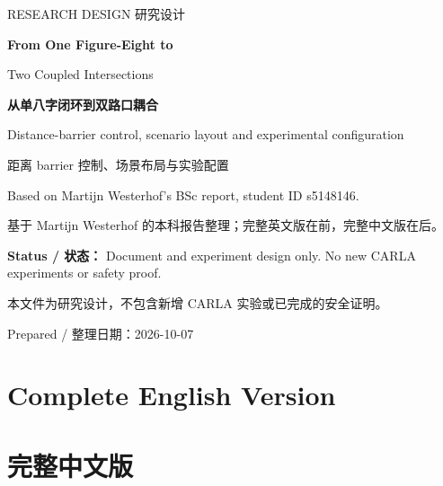 \documentclass[11pt,a4paper]{article}
\newif\ifChinese
\begin{document}
\hypersetup{pageanchor=false}
\begin{titlepage}
\vspace*{24mm}
{\color{teal}\large RESEARCH DESIGN \quad 研究设计\par}
\vspace{10mm}
{\color{navy}\Huge\bfseries From One Figure-Eight to\par Two Coupled Intersections\par}
\vspace{10mm}
{\LARGE\bfseries 从单八字闭环到双路口耦合\par}
\vspace{8mm}
{\large Distance-barrier control, scenario layout and experimental configuration\par}
{\large 距离 barrier 控制、场景布局与实验配置\par}
\vfill
Based on Martijn Westerhof's BSc report, student ID s5148146.\par
基于 Martijn Westerhof 的本科报告整理；完整英文版在前，完整中文版在后。\par
\vspace{5mm}
\textbf{Status / 状态：} Document and experiment design only. No new CARLA experiments or safety proof.\par
本文件为研究设计，不包含新增 CARLA 实验或已完成的安全证明。\par
\vspace{5mm}
Prepared / 整理日期：2026-10-07
\end{titlepage}
\hypersetup{pageanchor=true}
\tableofcontents
\clearpage
\Chinesefalse
\part{Complete English Version}

\clearpage
\Chinesetrue
\part{完整中文版}

\clearpage
\nocite{carla}
\renewcommand{\refname}{References / 参考文献}


\end{document}
